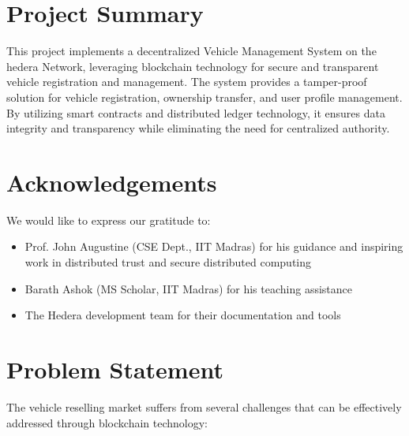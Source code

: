 \documentclass[12pt,a4paper]{article}
\begin{document}
    \section{Project Summary}
    This project implements a decentralized Vehicle Management System on the \gls{hedera} Network, leveraging blockchain technology for secure and transparent vehicle registration and management. The system provides a tamper-proof solution for vehicle registration, ownership transfer, and user profile management. By utilizing smart contracts and distributed ledger technology, it ensures data integrity and transparency while eliminating the need for centralized authority.


    \section{Acknowledgements}
    We would like to express our gratitude to:
    \begin{itemize}
        \item Prof. John Augustine (CSE Dept., IIT Madras) for his guidance and inspiring work in distributed trust and secure distributed computing
        \item Barath Ashok (MS Scholar, IIT Madras) for his teaching assistance
        \item The Hedera development team for their documentation and tools
    \end{itemize}


    \section{Problem Statement}
    The vehicle reselling market suffers from several challenges that can be effectively addressed through blockchain technology:
\end{document}
